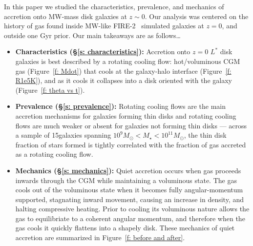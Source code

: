 \documentclass[fleqn,usenatbib]{mnras}
\newcommand{\Nsample}{15}
\begin{document}
In this paper we studied the characteristics, prevalence, and mechanics of accretion onto MW-mass disk galaxies at $z \sim 0$.
Our analysis was centered on the history of gas found inside MW-like FIRE-2~\citep{Hopkins2018} simulated galaxies at $z=0$, and outside one Gyr prior.
Our main takeaways are as follows\ldots
\begin{itemize}
    \item \textbf{Characteristics (\S\ref{s: characteristics}):}
    Accretion onto $z=0$ $L^*$ disk galaxies is best described by a rotating cooling flow:
    hot/voluminous CGM gas (Figure~\ref{f: Mdot}) that cools at the galaxy-halo interface (Figure~\ref{f: R1e5K}), and as it cools it collapses into a disk oriented with the galaxy (Figure~\ref{f: theta vs t}).
    \item \textbf{Prevalence (\S\ref{s: prevalence}):}
    Rotating cooling flows are the main accretion mechanisms for galaxies forming thin disks and rotating cooling flows are much weaker or absent for galaxies not forming thin disks ---
    across a sample of \Nsample galaxies spanning $10^9 M_\odot < M_\star < 10^11 M_\odot$, the thin disk fraction of stars formed is tightly correlated with the fraction of gas accreted as a rotating cooling flow.
    \item \textbf{Mechanics (\S\ref{s: mechanics}):}
    Quiet accretion occurs when gas proceeds inwards through the CGM while maintaining a voluminous state.
    The gas cools out of the voluminous state when it becomes fully angular-momentum supported, stagnating inward movement, causing an increase in density, and halting compressive heating.
    Prior to cooling its voluminous nature allows the gas to equilibriate to a coherent angular momentum, and therefore when the gas cools it quickly flattens into a shapely disk.
    These mechanics of quiet accretion are summarized in Figure~\ref{f: before and after}.
\end{itemize}
\end{document}
